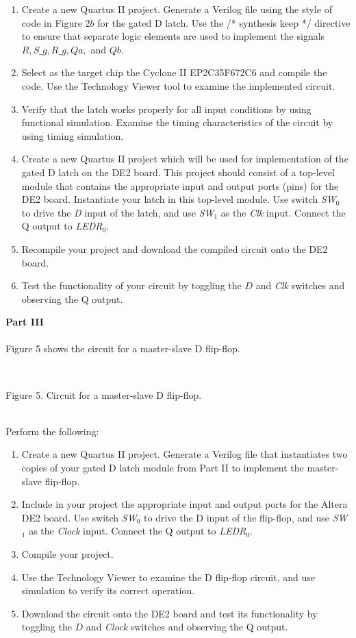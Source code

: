 \documentclass[epsfig,10pt,fullpage]{article}
\begin{document}
\begin{enumerate}
\item Create a new Quartus II project. Generate a Verilog file using the style of code 
in Figure 2$b$ for the gated D latch. Use the /* synthesis keep */ directive to ensure
that separate logic elements are used to implement the signals $R, S\_g, R\_g, Qa,$ and
$Qb$.
\item Select as the target chip the Cyclone II EP2C35F672C6 and compile the code. Use the 
Technology Viewer tool to examine the implemented circuit.
\item Verify that the latch works properly for all input conditions by using functional 
simulation. Examine the timing characteristics of the circuit by using timing simulation.
\item Create a new Quartus II project which will be used for implementation of the gated D
latch on the DE2 board. This project should consist of a top-level module that 
contains the appropriate input and output ports (pins) for the DE2 board. Instantiate your
latch in this top-level module. Use switch {\it SW}$_0$ to drive the {\it D} input of the latch,
and use {\it SW}$_1$ as the {\it Clk} input. Connect the Q output to {\it LEDR}$_{0}$.
\item
Recompile your project and download the compiled circuit onto the DE2 board.
\item
Test the functionality of your circuit by toggling the $D$ and {\it Clk} switches and observing 
the Q output.
\end{enumerate}

\pagebreak
\noindent
{\bf Part III}
~\\
~\\
\noindent
Figure 5 shows the circuit for a master-slave D flip-flop.
~\\

\begin{figure}[H]
\scriptsize
\centerline{
\hbox{}}
\end{figure}
~\\
\centerline{Figure 5.  Circuit for a master-slave D flip-flop.}

~\\
\noindent
Perform the following:
\begin{enumerate}
\item Create a new Quartus II project. Generate a Verilog file that instantiates two
copies of your gated D latch module from Part II to implement the master-slave flip-flop.
\item Include in your project the appropriate input and output ports for the Altera
DE2 board. Use switch {\it SW}$_0$ to drive the D input of the flip-flop,
and use {\it SW}$_1$ as the {\it Clock} input. Connect the Q output to {\it LEDR}$_{0}$.
\item
Compile your project.
\item Use the Technology Viewer to examine the D flip-flop circuit, and use
simulation to verify its correct operation.
\item
Download the circuit onto the DE2 board and test its functionality 
by toggling the $D$ and {\it Clock} switches and observing the Q output.
\end{enumerate}
\end{document}
